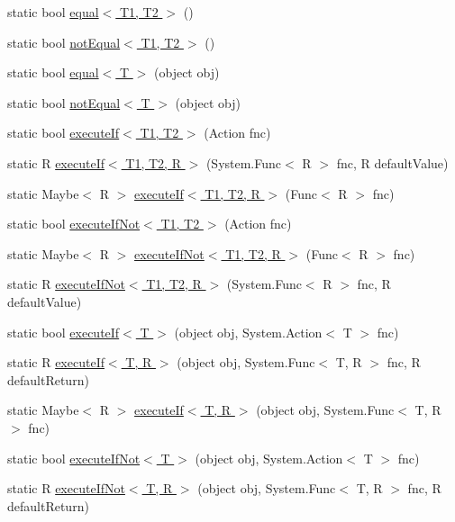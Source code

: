 \begin{DoxyCompactItemize}
\item 
static bool \hyperlink{class_prelude_aa9f09fbef5995a67b1bde6b691b80683}{equal$<$ T1, T2 $>$} ()
\item 
static bool \hyperlink{class_prelude_af357d7e16b8a28ed5b037652347cb595}{not\+Equal$<$ T1, T2 $>$} ()
\item 
static bool \hyperlink{class_prelude_a341e39f3a62858e4b2e288b3315c5859}{equal$<$ T $>$} (object obj)
\item 
static bool \hyperlink{class_prelude_ab96569f1e29f848cc663ee39b84b7202}{not\+Equal$<$ T $>$} (object obj)
\item 
static bool \hyperlink{class_prelude_a66d013aa460f883ceef072fcac77e9c5}{execute\+If$<$ T1, T2 $>$} (Action fnc)
\item 
static R \hyperlink{class_prelude_a8644a26805a5ec48d434589ba930d8e5}{execute\+If$<$ T1, T2, R $>$} (System.\+Func$<$ R $>$ fnc, R default\+Value)
\item 
static Maybe$<$ R $>$ \hyperlink{class_prelude_abafb7ca44f72e8a48ad3fbc23f75c8d5}{execute\+If$<$ T1, T2, R $>$} (Func$<$ R $>$ fnc)
\item 
static bool \hyperlink{class_prelude_ab29ef2714ec1d9f1aedfcb265df331a7}{execute\+If\+Not$<$ T1, T2 $>$} (Action fnc)
\item 
static Maybe$<$ R $>$ \hyperlink{class_prelude_a8722690313b902a471eb51a119fd6640}{execute\+If\+Not$<$ T1, T2, R $>$} (Func$<$ R $>$ fnc)
\item 
static R \hyperlink{class_prelude_aaa88e746cad8d449d9feedbe07f18db1}{execute\+If\+Not$<$ T1, T2, R $>$} (System.\+Func$<$ R $>$ fnc, R default\+Value)
\item 
static bool \hyperlink{class_prelude_aac308251a0a2fd03ffc9d3a8539ec106}{execute\+If$<$ T $>$} (object obj, System.\+Action$<$ T $>$ fnc)
\item 
static R \hyperlink{class_prelude_aeebeb156a131037fb8553bacaefb3e9e}{execute\+If$<$ T, R $>$} (object obj, System.\+Func$<$ T, R $>$ fnc, R default\+Return)
\item 
static Maybe$<$ R $>$ \hyperlink{class_prelude_a2a7ac1b5fcf5d80a3c3bca27d3dc4c46}{execute\+If$<$ T, R $>$} (object obj, System.\+Func$<$ T, R $>$ fnc)
\item 
static bool \hyperlink{class_prelude_aeaf2446d36cb6ba65cd2de9ad8de359c}{execute\+If\+Not$<$ T $>$} (object obj, System.\+Action$<$ T $>$ fnc)
\item 
static R \hyperlink{class_prelude_a85e3aba3ac4d7e3346b3c9af79ca97e7}{execute\+If\+Not$<$ T, R $>$} (object obj, System.\+Func$<$ T, R $>$ fnc, R default\+Return)

\end{DoxyCompactItemize}
